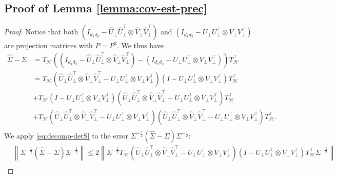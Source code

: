 \documentclass[12pt]{article}
\newcommand{\norm}[1]{\left\lVert#1\right\rVert}
\def\calH{{\mathcal H}}
\theoremstyle{plain}
\begin{document}
\subsection{Proof of Lemma \ref{lemma:cov-est-prec}}
\begin{proof}
Notice that both $\left(I_{d_1 d_2} - \widehat U_\perp \widehat U_\perp^\top \otimes \widehat V_\perp \widehat V_\perp^\top\right)$ and $\left(I_{d_1 d_2} -  U_\perp U_\perp^\top \otimes V_\perp V_\perp^\top\right)$ are projection matrices with $P=P^2$. We thus have
\begin{equation}\label{eq:decomp-detS}
   \begin{aligned}
     \widehat{\Sigma}-\Sigma&=T_{\calH}\left((I_{d_1 d_2} - \widehat U_\perp \widehat U_\perp^\top \otimes \widehat V_\perp \widehat V_\perp^\top  )-(I_{d_1 d_2} -  U_\perp U_\perp^\top \otimes V_\perp V_\perp^\top ) \right) T_{\calH}^\top \\
     & = T_{\calH}\left(\widehat U_\perp \widehat U_\perp^\top \otimes \widehat V_\perp \widehat V_\perp^\top - U_\perp U_\perp^\top \otimes V_\perp V_\perp^\top\right) \left(I-U_\perp U_\perp^\top \otimes V_\perp V_\perp^\top\right) T_{\calH}^\top\\
     & + T_{\calH}\left(I-U_\perp U_\perp^\top \otimes V_\perp V_\perp^\top\right) \left(\widehat U_\perp \widehat U_\perp^\top \otimes \widehat V_\perp \widehat V_\perp^\top - U_\perp U_\perp^\top \otimes V_\perp V_\perp^\top \right) T_{\calH}^\top \\
     & + T_{\calH}\left(\widehat U_\perp \widehat U_\perp^\top \otimes \widehat V_\perp \widehat V_\perp^\top - U_\perp U_\perp^\top \otimes V_\perp V_\perp^\top\right) \left(\widehat U_\perp \widehat U_\perp^\top \otimes \widehat V_\perp \widehat V_\perp^\top - U_\perp U_\perp^\top \otimes V_\perp V_\perp^\top\right) T_{\calH}^\top.\\
\end{aligned} 
\end{equation}
We apply \eqref{eq:decomp-detS} to the error $\Sigma^{-\frac{1}{2}}(\widehat{\Sigma}-\Sigma)\Sigma^{-\frac{1}{2}}$:
\begin{equation*}
    \begin{aligned}
      &\norm{\Sigma^{-\frac{1}{2}}(\widehat{\Sigma}-\Sigma)\Sigma^{-\frac{1}{2}} }\le 2\norm{\Sigma^{-\frac{1}{2}}T_{\calH}\left(\widehat U_\perp \widehat U_\perp^\top \otimes \widehat V_\perp \widehat V_\perp^\top - U_\perp U_\perp^\top \otimes V_\perp V_\perp^\top\right) \left(I-U_\perp U_\perp^\top \otimes V_\perp V_\perp^\top\right) T_{\calH}^\top \Sigma^{-\frac{1}{2}} }\\

\end{aligned}
\end{equation*}
\end{proof}
\end{document}
